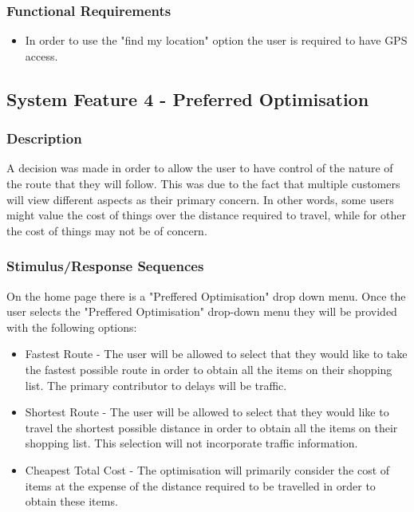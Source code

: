 \documentclass[10pt, a4paper, onecolumn]{scrartcl}
\begin{document}
			\subsubsection{Functional Requirements}
			
				\begin{itemize}
					\item In order to use the "find my location" option the user is required to have GPS access.
				\end{itemize}
				
		\subsection{System Feature 4 - Preferred Optimisation}
		
			\subsubsection{Description}
			
				A decision was made in order to allow the user to have control of the nature of the route that they will follow. This was due to the fact that multiple customers will view different aspects as their primary concern. In other words, some users might value the cost of things over the distance required to travel, while for other the cost of things may not be of concern.
			
			\subsubsection{Stimulus/Response Sequences}
			
				On the home page there is a "Preffered Optimisation" drop down menu. Once the user selects the "Preffered Optimisation" drop-down menu they will be provided with the following options:
				
				\begin{itemize}
					\item Fastest Route - The user will be allowed to select that they would like to take the fastest possible route in order to obtain all the items on their shopping list. The primary contributor to delays will be traffic.
					\item Shortest Route - The user will be allowed to select that they would like to travel the shortest possible distance in order to obtain all the items on their shopping list. This selection will not incorporate traffic information.
					\item Cheapest Total Cost - The optimisation will primarily consider the cost of items at the expense of the distance required to be travelled in order to obtain these items. 
				\end{itemize}
				
\end{document}
